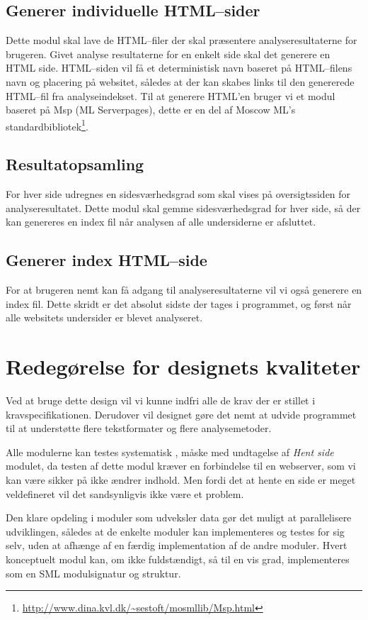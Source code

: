 \documentclass[a4paper,oneside,article]{memoir}
\begin{document}
\subsection{Generer individuelle HTML--sider}
Dette modul skal lave de HTML--filer der skal præsentere
analyseresultaterne for brugeren. Givet analyse resultaterne for en
enkelt side skal det generere en HTML side. HTML--siden vil få et
deterministisk navn baseret på HTML--filens navn og placering på
websitet, således at der kan skabes links til den genererede HTML--fil
fra analyseindekset. Til at generere HTML'en bruger vi et modul
baseret på Msp (ML Serverpages), dette er en del af Moscow ML's
standardbibliotek\footnote{\url{http://www.dina.kvl.dk/~sestoft/mosmllib/Msp.html}}.

\subsection{Resultatopsamling}
For hver side udregnes en sidesværhedsgrad som skal vises på
oversigtssiden for analyseresultatet. Dette modul skal gemme
sidesværhedsgrad for hver side, så der kan genereres en index fil når
analysen af alle undersiderne er afsluttet.

\subsection{Generer index HTML--side}
For at brugeren nemt kan få adgang til analyseresultaterne vil vi også
generere en index fil. Dette skridt er det absolut sidste der tages i
programmet, og først når alle websitets undersider er blevet
analyseret.

\section{Redegørelse for designets kvaliteter}
Ved at bruge dette design vil vi kunne indfri alle de krav der er
stillet i kravspecifikationen. Derudover vil designet gøre det nemt at
udvide programmet til at understøtte flere tekstformater og flere
analysemetoder.

Alle modulerne kan testes systematisk , måske med
undtagelse af
\textit{Hent side} modulet, da testen af dette modul kræver en
forbindelse til en webserver, som vi kan være sikker på ikke ændrer
indhold. Men fordi det at hente en side er meget veldefineret vil det
sandsynligvis ikke være et problem.

Den klare opdeling i moduler som udveksler data gør det muligt at
parallelisere udviklingen, således at de enkelte moduler kan
implementeres og testes for sig selv, uden at afhænge af en færdig
implementation af de andre moduler. Hvert konceptuelt modul kan, om
ikke fuldstændigt, så til en vis grad, implementeres som en SML
modulsignatur og struktur.
\end{document}
